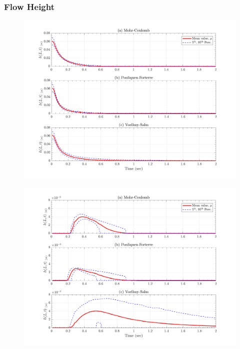 \documentclass{article}
\begin{document}
\subsubsection{Flow Height}

\begin{figure}[H]
	\begin{minipage}[b]{0.5\linewidth}
    	\centering
    	\includegraphics[width=1\textwidth]{InclinedPlane/Height/H_L1.png}
    	\label{fig:Ramp-L1-H}
	\end{minipage}
	\begin{minipage}[b]{0.5\linewidth}
		\centering
		\includegraphics[width=1\textwidth]{InclinedPlane/Height/H_L2.png}
    	\label{fig:Ramp-L2-H}
    \end{minipage}


\end{figure}
\end{document}
